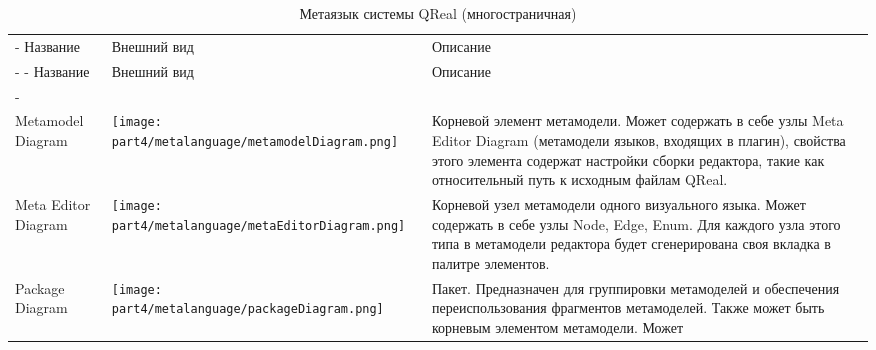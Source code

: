 \begin{center}
	\begin{longtabu} {| X[1 l m] | X[2 c m] | X[3 m] |}
		\caption{Метаязык системы QReal} \\
		\tabucline-
		Название                    & Внешний вид                                                                     & Описание \\
		\tabucline-
		\endfirsthead
		\tabucline-
		Название                    & Внешний вид                                                                     & Описание \\
		\tabucline-
		\endhead
		\noalign{\vspace{3mm}}\caption{Метаязык системы QReal (многостраничная)} \\
		\endfoot
		\everyrow{\tabucline-}
		Metamodel Diagram           & \texttt{[image: part4/metalanguage/metamodelDiagram.png]}              & Корневой элемент метамодели. Может содержать в себе 
		                                                                                                                узлы Meta Editor Diagram (метамодели языков, входящих в 
		                                                                                                                плагин), свойства этого элемента содержат настройки сборки 
		                                                                                                                редактора, такие как относительный путь к исходным файлам 
		                                                                                                                QReal. \\
		Meta Editor Diagram         & \texttt{[image: part4/metalanguage/metaEditorDiagram.png]}           & Корневой узел метамодели одного визуального языка. Может 
		                                                                                                                содержать в себе узлы Node, Edge, Enum. Для каждого узла 
		                                                                                                                этого типа в метамодели редактора будет сгенерирована своя 
		                                                                                                                вкладка в палитре элементов. \\
		Package Diagram             & \texttt{[image: part4/metalanguage/packageDiagram.png]}              & Пакет. Предназначен для группировки метамоделей и обеспечения переиспользования 
		                                                                                                                фрагментов метамоделей. Также может быть корневым элементом метамодели. Может  

\end{longtabu}
\end{center}
